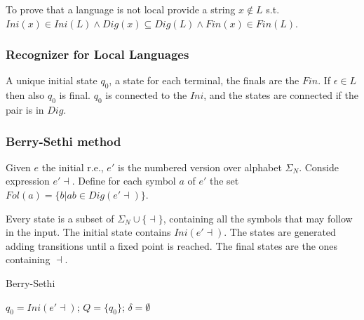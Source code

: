 To prove that a language is not local provide a string $x\notin L$ s.t. $Ini(x) \in Ini(L) \land Dig(x) \subseteq Dig(L) \land Fin(x) \in Fin(L)$.

\subsubsection{Recognizer for Local Languages}

A unique initial state $q_0$, a state for each terminal, the finals are the $Fin$. If $\epsilon \in L$ then also $q_0$ is final. $q_0$ is connected to the $Ini$, and the states are connected if the pair is in $Dig$.

\subsubsection{Berry-Sethi method}

Given $e$ the initial r.e., $e'$ is the numbered version over alphabet $\Sigma_N$. Conside expression $e' \dashv$. Define for each symbol $a$ of $e'$ the set $Fol(a) = \{b | ab \in Dig(e'\dashv)\}$.

Every state is a subset of $\Sigma_N \cup \{\dashv\}$, containing all the symbols that may follow in the input. The initial state contains $Ini(e'\dashv)$. The states are generated adding transitions until a fixed point is reached. The final states are the ones containing $\dashv$.

\begin{algorithm*}[H]
    \caption{Berry-Sethi}
    \SetAlgoLined
    $q_0 = Ini(e'\dashv)$;
    $Q = \{q_0\}$;
    $\delta=\emptyset$\;
\end{algorithm*}
